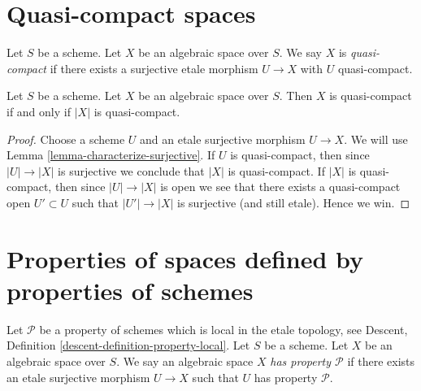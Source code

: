 \section{Quasi-compact spaces}
\label{section-quasi-compact}

\begin{definition}
\label{definition-quasi-compact}
Let $S$ be a scheme.
Let $X$ be an algebraic space over $S$.
We say $X$ is {\it quasi-compact} if there exists a surjective
etale morphism $U \to X$ with $U$ quasi-compact.
\end{definition}

\begin{lemma}
\label{lemma-quasi-compact-space}
Let $S$ be a scheme.
Let $X$ be an algebraic space over $S$.
Then $X$ is quasi-compact if and only if $|X|$ is quasi-compact.
\end{lemma}

\begin{proof}
Choose a scheme $U$ and an etale surjective morphism $U \to X$.
We will use Lemma \ref{lemma-characterize-surjective}.
If $U$ is quasi-compact, then since $|U| \to |X|$ is surjective
we conclude that $|X|$ is quasi-compact.
If $|X|$ is quasi-compact, then since $|U| \to |X|$ is open
we see that there exists a quasi-compact open $U' \subset U$
such that $|U'| \to |X|$ is surjective (and still etale).
Hence we win.
\end{proof}




\section{Properties of spaces defined by properties of schemes}
\label{section-types-properties}

\begin{definition}
\label{definition-type-property}
Let $\mathcal{P}$ be a property of schemes which is 
local in the etale topology, see
Descent, Definition \ref{descent-definition-property-local}.
Let $S$ be a scheme.
Let $X$ be an algebraic space over $S$.
We say an algebraic space $X$ {\it has property $\mathcal{P}$}
if there exists an etale surjective morphism $U \to X$ such
that $U$ has property $\mathcal{P}$.
\end{definition}

